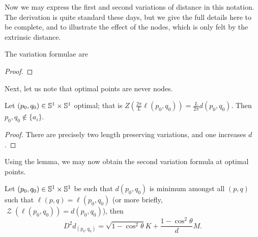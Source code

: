 \documentclass[11pt]{amsart}
\DeclareMathOperator{\chordarcprofile}{\mathcal{Z}}
\begin{document}
Now we may express the first and second variations of distance in this notation. The derivation is quite standard these days, but we give the full details here to be complete, and to illustrate the effect of the nodes, which is only felt by the extrinsic distance.

\begin{lemma}
The variation formulae are
\end{lemma}

\begin{proof}

\end{proof}

Next, let us note that optimal points are never nodes.

\begin{lemma}
Let \((p_0,q_0) \in \mathbb{S}^1 \times \mathbb{S}^1\) optimal; that is \(Z(\tfrac{2\pi}{L}\ell(p_0,q_0)) = \tfrac{L}{2\pi} d(p_0, q_0)\). Then \(p_0,q_0 \notin \{a_i\}\).
\end{lemma}

\begin{proof}
There are precisely two length preserving variations, and one increases \(d\).
\end{proof}

Using the lemma, we may now obtain the second variation formula at optimal points.

\begin{prop}
\label{prop:spatial_var}
Let $(p_0, q_0) \in \mathbb{S}^1 \times \mathbb{S}^1$ be such that $d(p_0, q_0)$ is minimum amongst all $(p,q)$ such that $\ell(p, q) = \ell(p_0, q_0)$ (or more briefly, $\chordarcprofile(\ell(p_0,q_0)) = d(p_0, q_0)$), then 
\[
D^2d_{(p_0,q_0)} =  \sqrt{1-\cos^2\theta}K + \frac{1-\cos^2 \theta}{d} M.
\]
\end{prop}
\end{document}

